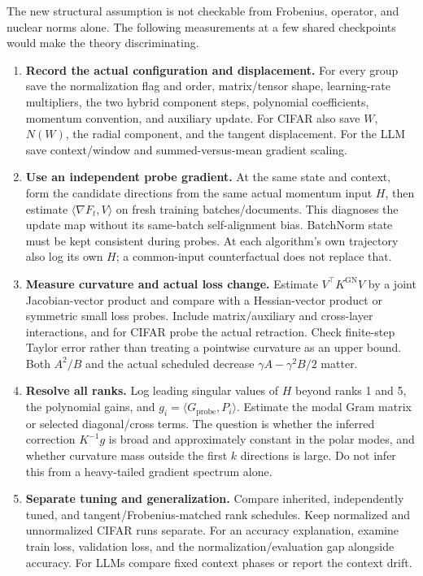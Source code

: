 \documentclass[11pt]{article}
\newcommand{\ip}[2]{\langle #1,#2\rangle}
\begin{document}
The new structural assumption is not checkable from Frobenius, operator,
and nuclear norms alone. The following measurements at a few shared
checkpoints would make the theory discriminating.
\begin{enumerate}
\item \textbf{Record the actual configuration and displacement.}
For every group save the normalization flag and order, matrix/tensor shape,
learning-rate multipliers, the two hybrid component steps, polynomial
coefficients, momentum convention, and auxiliary update. For CIFAR also
save $W$, $N(W)$, the radial component, and the tangent displacement.
For the LLM save context/window and summed-versus-mean gradient scaling.
\item \textbf{Use an independent probe gradient.}
At the same state and context, form the candidate directions from the
same actual momentum input $H$, then estimate
$\ip{\nabla F_t}{V}$ on fresh training batches/documents. This diagnoses
the update map without its same-batch self-alignment bias. BatchNorm state
must be kept consistent during probes. At each algorithm's own trajectory
also log its own $H$; a common-input counterfactual does not replace that.
\item \textbf{Measure curvature and actual loss change.}
Estimate $V^\top K^{\mathrm{GN}}V$ by a joint Jacobian-vector product and
compare with a Hessian-vector product or symmetric small loss probes.
Include matrix/auxiliary and cross-layer interactions, and for CIFAR
probe the actual retraction. Check finite-step Taylor error rather than
treating a pointwise curvature as an upper bound. Both
$A^2/B$ and the actual scheduled decrease $\gamma A-\gamma^2B/2$ matter.
\item \textbf{Resolve all ranks.}
Log leading singular values of $H$ beyond ranks 1 and 5, the polynomial
gains, and $g_i=\ip{G_{\mathrm{probe}}}{P_i}$. Estimate the modal Gram matrix
or selected diagonal/cross terms. The question is whether the inferred
correction $K^{-1}g$ is broad and approximately constant in the polar
modes, and whether curvature mass outside the first $k$ directions is
large. Do not infer this from a heavy-tailed gradient spectrum alone.
\item \textbf{Separate tuning and generalization.}
Compare inherited, independently tuned, and tangent/Frobenius-matched
rank schedules. Keep normalized and unnormalized CIFAR runs separate.
For an accuracy explanation, examine train loss, validation loss, and the
normalization/evaluation gap alongside accuracy. For LLMs compare fixed
context phases or report the context drift.
\end{enumerate}
\end{document}
